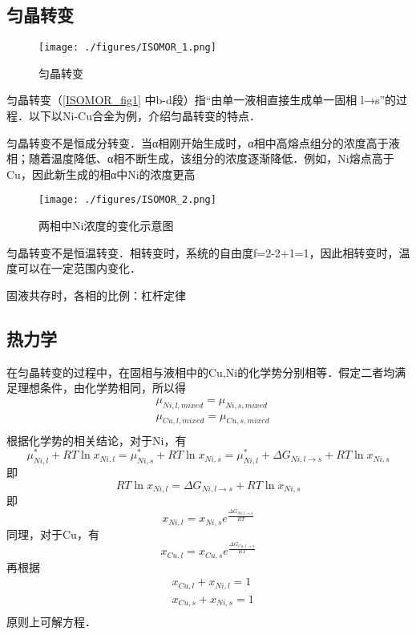
\subsection{匀晶转变}
\begin{figure}[ht]
\centering
\texttt{[image: ./figures/ISOMOR\_1.png]}
\caption{匀晶转变} \label{ISOMOR_fig1}
\end{figure}

匀晶转变（\autoref{ISOMOR_fig1} 中b-d段）指“由单一液相直接生成单一固相 l→s”的过程．以下以Ni-Cu合金为例，介绍匀晶转变的特点．

匀晶转变不是恒成分转变．当α相刚开始生成时，α相中高熔点组分的浓度高于液相；随着温度降低、α相不断生成，该组分的浓度逐渐降低．例如，Ni熔点高于Cu，因此新生成的相α中Ni的浓度更高
\begin{figure}[ht]
\centering
\texttt{[image: ./figures/ISOMOR\_2.png]}
\caption{两相中Ni浓度的变化示意图} \label{ISOMOR_fig2}
\end{figure}

匀晶转变不是恒温转变．相转变时，系统的自由度f=2-2+1=1，因此相转变时，温度可以在一定范围内变化．

固液共存时，各相的比例：杠杆定律

\subsection{热力学}
在匀晶转变的过程中，在固相与液相中的Cu,Ni的化学势分别相等．假定二者均满足理想条件，由化学势相同，所以得
\begin{align}
&\mu_{Ni,l,mixed}=\mu_{Ni,s,mixed}\\
&\mu_{Cu,l,mixed}=\mu_{Cu,s,mixed}\\
\end{align}
根据化学势的相关结论，对于Ni，有
$$
\mu_{Ni,l}^*+RT \ln x_{Ni,l}=\mu_{Ni,s}^*+RT \ln x_{Ni,s}=\mu_{Ni,l}^*+\Delta G_{Ni, l\rightarrow s} + RT \ln x_{Ni,s}
$$
即
$$
RT \ln x_{Ni,l}=\Delta G_{Ni, l\rightarrow s} + RT \ln x_{Ni,s}
$$
即
\begin{equation}
x_{Ni,l}=x_{Ni,s}e^{\frac{\Delta G_{Ni, l\rightarrow s}}{RT}}
\end{equation}
同理，对于Cu，有
\begin{equation}
x_{Cu,l}=x_{Cu,s}e^{\frac{\Delta G_{Cu, l\rightarrow s}}{RT}}
\end{equation}
再根据
\begin{align}
&x_{Cu,l}+x_{Ni,l}=1\\
&x_{Cu,s}+x_{Ni,s}=1\\
\end{align}
原则上可解方程．
